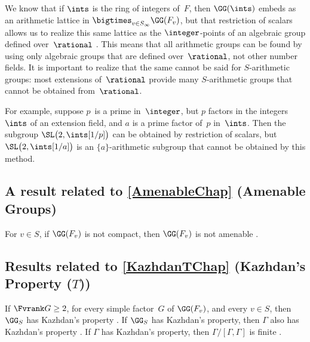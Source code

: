 \begin{warn*}
We know that if $\ints$ is the ring of integers of~$F$, then $\GG(\ints)$ embeds as an arithmetic lattice in $\bigtimes_{v \in S_\infty} \GG(F_v)$, but that restriction of scalars allows us to realize this same lattice as the $\integer$-points of an algebraic group defined over~$\rational$ . This means that all arithmetic groups can be found by using only algebraic groups that are defined over~$\rational$, not other number fields. It is important to realize that the same cannot be said for $S$-arithmetic groups: most extensions of~$\rational$ provide many $S$-arithmetic groups that cannot be obtained from~$\rational$. 

For example, suppose $p$~is a prime in~$\integer$, but $p$ factors in the integers~$\ints$ of an extension field, and $a$ is a prime factor of~$p$ in~$\ints$. Then the subgroup $\SL \bigl( 2, \ints[1/p] \bigr)$ can be obtained by restriction of scalars, but $\SL \bigl( 2, \ints[1/a] \bigr)$ is an $\{a\}$-arithmetic subgroup that cannot be obtained by this method.
\end{warn*}



\subsection*{A result related to \cref{AmenableChap} (Amenable Groups)}
	\begin{slist}
For $v \in S$, if $\GG(F_v)$ is not compact, then $\GG(F_v)$ is not amenable
	 \cite[Rem.~8.7.11, p.~260]{ReiterStegeman-HarmAnalLocCpctGrps}.
	\end{slist}


\subsection*{Results related to \cref{KazhdanTChap} (Kazhdan's Property ($T$))}
	\begin{slist}
If $\Fvrank G \ge 2$, for every simple factor~$G$ of $\GG(F_v)$, and every $v \in S$, then
 $\GG_S$ has Kazhdan's property
 \cite[Cor.~III.5.4, p.~130]{MargulisBook}.
If $\GG_S$ has Kazhdan's property, then $\Gamma$ also has Kazhdan's property
\cite[Thm.~III.2.12, p.~117]{MargulisBook}.
 If $\Gamma$ has Kazhdan's property, then $\Gamma/[\Gamma ,\Gamma ]$ is finite
 \cite[Thm.~III.2.5, p.~115]{MargulisBook}.
	\end{slist}


